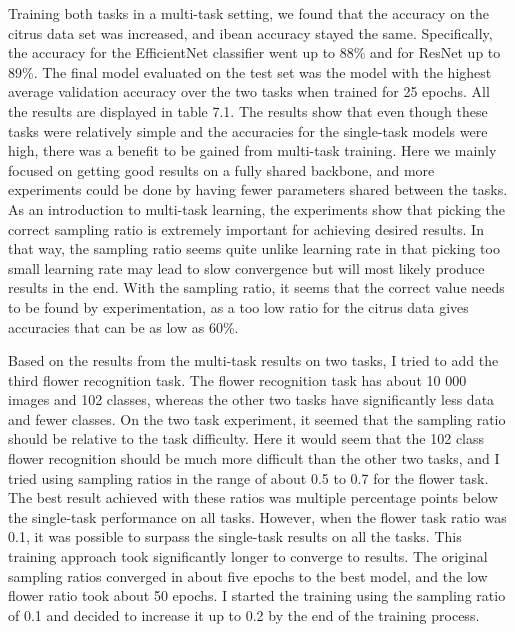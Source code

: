 Training both tasks in a multi-task setting, we found that the accuracy on the citrus data set was increased, and ibean accuracy stayed the same.
Specifically, the accuracy for the EfficientNet classifier went up to 88\% and for ResNet up to 89\%.
The final model evaluated on the test set was the model with the highest average validation accuracy over the two tasks when trained for 25 epochs.
All the results are displayed in table 7.1.
The results show that even though these tasks were relatively simple and the accuracies for the single-task models were high, there was a benefit to be gained from multi-task training.
Here we mainly focused on getting good results on a fully shared backbone, and more experiments could be done by having fewer parameters shared between the tasks.
As an introduction to multi-task learning, the experiments show that picking the correct sampling ratio is extremely important for achieving desired results.
In that way, the sampling ratio seems quite unlike learning rate in that picking too small learning rate may lead to slow convergence but will most likely produce results in the end.
With the sampling ratio, it seems that the correct value needs to be found by experimentation, as a too low ratio for the citrus data gives accuracies that can be as low as 60\%.

Based on the results from the multi-task results on two tasks, I tried to add the third flower recognition task.
The flower recognition task has about 10 000 images and 102 classes, whereas the other two tasks have significantly less data and fewer classes.
On the two task experiment, it seemed that the sampling ratio should be relative to the task difficulty.
Here it would seem that the 102 class flower recognition should be much more difficult than the other two tasks, and I tried using sampling ratios in the range of about 0.5 to 0.7 for the flower task.
The best result achieved with these ratios was multiple percentage points below the single-task performance on all tasks.
However, when the flower task ratio was 0.1, it was possible to surpass the single-task results on all the tasks.
This training approach took significantly longer to converge to results.
The original sampling ratios converged in about five epochs to the best model, and the low flower ratio took about 50 epochs.
I started the training using the sampling ratio of 0.1 and decided to increase it up to 0.2 by the end of the training process.

